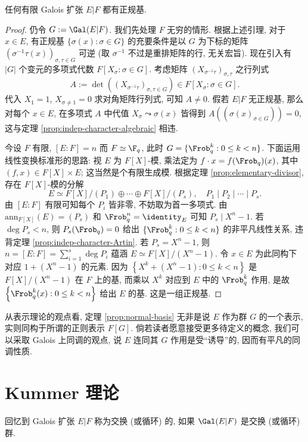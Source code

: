 \begin{theorem}\label{prop:normal-basis}
	任何有限 Galois 扩张 $E|F$ 都有正规基.
\end{theorem}
\begin{proof}
	仍令 $G := \Gal(E|F)$. 我们先处理 $F$ 无穷的情形. 根据上述引理, 对于 $x \in E$, 有正规基 $\{\sigma(x) : \sigma \in G \}$ 的充要条件是以 $G$ 为下标的矩阵 $(\sigma^{-1}\tau(x))_{\sigma, \tau \in G}$ 可逆 (取 $\sigma^{-1}$ 不过是重排矩阵的行, 无关宏旨). 现在引入有 $|G|$ 个变元的多项式代数 $F[X_\sigma : \sigma \in G]$. 考虑矩阵 $(X_{\sigma^{-1}\tau})_{\sigma,\tau}$ 之行列式
	\[ A := \det\left( (X_{\sigma^{-1}\tau})_{\sigma, \tau \in G} \right) \in F[X_\sigma : \sigma \in G]. \]
	代入 $X_1 = 1$, $X_{\sigma \neq 1} = 0$ 求对角矩阵行列式, 可知 $A \neq 0$. 假若 $E|F$ 无正规基, 那么对每个 $x \in E$, 在多项式 $A$ 中代值 $X_\sigma \leadsto \sigma(x)$ 皆得到 $A((\sigma(x)_{\sigma \in G})) = 0$, 这与定理 \ref{prop:indep-character-algebraic} 相违.
	
	今设 $F$ 有限, $[E:F]=n$ 而 $F \simeq \F_q$, 此时 $G = \{\Frob_q^k : 0 \leq k < n \}$. 下面运用线性变换标准形的思路: 视 $E$ 为 $F[X]$-模, 乘法定为 $f \cdot x = f(\Frob_q)(x)$, 其中 $(f,x) \in F[X] \times E$; 这当然是个有限生成模. 根据定理 \ref{prop:elementary-divisor}, 存在 $F[X]$-模的分解
	\[ E \simeq F[X]/(P_1) \oplus \cdots \oplus F[X]/(P_s), \quad P_1 \mid P_2 \mid \cdots \mid P_s. \]
	由 $[E:F]$ 有限可知每个 $P_i$ 皆非零, 不妨取为首一多项式. 由 $\text{ann}_{F[X]}(E) = (P_s)$ 和 $\Frob_q^n = \identity_E$ 可知 $P_s \mid X^n - 1$. 若 $\deg P_s < n$, 则 $P_s(\Frob_q)=0$ 给出 $\{\Frob_q^k : 0 \leq k < n \}$ 的非平凡线性关系, 违背定理 \ref{prop:indep-character-Artin}. 若 $P_s = X^n - 1$, 则 $n = [E:F] = \sum_{i=1}^s \deg P_i$ 蕴涵 $E \simeq F[X]/(X^n-1)$. 令 $x \in E$ 为此同构下对应 $1 + (X^n - 1)$ 的元素. 因为 $\left\{ X^k + (X^n - 1) : 0 \leq k < n \right\}$ 是 $F[X]/(X^n-1)$ 在 $F$ 上的基, 而乘以 $X^k$ 对应到 $E$ 中的 $\Frob_q^k$ 作用, 是故 $\left\{ \Frob_q^k(x) : 0 \leq k < n \right\}$ 给出 $E$ 的基. 这是一组正规基.
\end{proof}

从表示理论的观点看, 定理 \ref{prop:normal-basis} 无非是说 $E$ 作为群 $G$ 的一个表示, 实则同构于所谓的正则表示 $F[G]$. 倘若读者愿意接受更多待定义的概念, 我们可以采取 Galois 上同调的观点, 说 $E$ 连同其 $G$ 作用是受``诱导''的, 因而有平凡的同调性质.

\section{Kummer 理论}\label{sec:Kummer-theory}
回忆到 Galois 扩张 $E|F$ 称为交换 (或循环) 的, 如果 $\Gal(E|F)$ 是交换 (或循环) 群.

